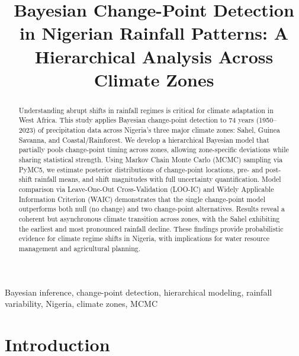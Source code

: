 \documentclass[conference]{IEEEtran}
\begin{document}
\title{Bayesian Change-Point Detection in Nigerian Rainfall Patterns: A Hierarchical Analysis Across Climate Zones}

\author{
}

\maketitle

\begin{abstract}
Understanding abrupt shifts in rainfall regimes is critical for climate adaptation in West Africa. This study applies Bayesian change-point detection to 74 years (1950--2023) of precipitation data across Nigeria's three major climate zones: Sahel, Guinea Savanna, and Coastal/Rainforest. We develop a hierarchical Bayesian model that partially pools change-point timing across zones, allowing zone-specific deviations while sharing statistical strength. Using Markov Chain Monte Carlo (MCMC) sampling via PyMC5, we estimate posterior distributions of change-point locations, pre- and post-shift rainfall means, and shift magnitudes with full uncertainty quantification. Model comparison via Leave-One-Out Cross-Validation (LOO-IC) and Widely Applicable Information Criterion (WAIC) demonstrates that the single change-point model outperforms both null (no change) and two change-point alternatives. Results reveal a coherent but asynchronous climate transition across zones, with the Sahel exhibiting the earliest and most pronounced rainfall decline. These findings provide probabilistic evidence for climate regime shifts in Nigeria, with implications for water resource management and agricultural planning.
\end{abstract}

\begin{IEEEkeywords}
Bayesian inference, change-point detection, hierarchical modeling, rainfall variability, Nigeria, climate zones, MCMC
\end{IEEEkeywords}

\section{Introduction}
\end{document}
